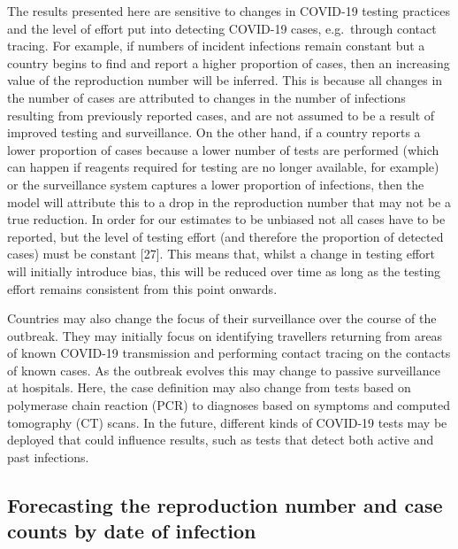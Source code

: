 \documentclass[]{article}
\begin{document}
The results presented here are sensitive to changes in COVID-19 testing
practices and the level of effort put into detecting COVID-19 cases,
e.g.~through contact tracing. For example, if numbers of incident
infections remain constant but a country begins to find and report a
higher proportion of cases, then an increasing value of the reproduction
number will be inferred. This is because all changes in the number of
cases are attributed to changes in the number of infections resulting
from previously reported cases, and are not assumed to be a result of
improved testing and surveillance. On the other hand, if a country
reports a lower proportion of cases because a lower number of tests are
performed (which can happen if reagents required for testing are no
longer available, for example) or the surveillance system captures a
lower proportion of infections, then the model will attribute this to a
drop in the reproduction number that may not be a true reduction. In
order for our estimates to be unbiased not all cases have to be
reported, but the level of testing effort (and therefore the proportion
of detected cases) must be constant {[}27{]}. This means that, whilst a
change in testing effort will initially introduce bias, this will be
reduced over time as long as the testing effort remains consistent from
this point onwards.

Countries may also change the focus of their surveillance over the
course of the outbreak. They may initially focus on identifying
travellers returning from areas of known COVID-19 transmission and
performing contact tracing on the contacts of known cases. As the
outbreak evolves this may change to passive surveillance at hospitals.
Here, the case definition may also change from tests based on polymerase
chain reaction (PCR) to diagnoses based on symptoms and computed
tomography (CT) scans. In the future, different kinds of COVID-19 tests
may be deployed that could influence results, such as tests that detect
both active and past infections.

\hypertarget{forecasting-the-reproduction-number-and-case-counts-by-date-of-infection}{%
\subsection{Forecasting the reproduction number and case counts by date
of
infection}\label{forecasting-the-reproduction-number-and-case-counts-by-date-of-infection}}
\end{document}
